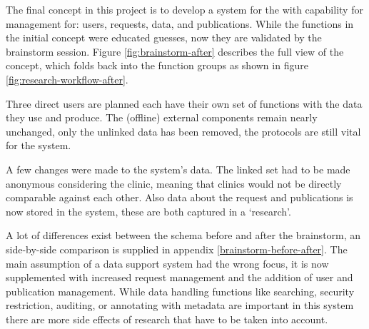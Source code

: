 The final concept in this project is to develop a system for the \projectdata{} with capability for management for: users, requests, data, and publications.
While the functions in the initial concept were educated guesses, now they are validated by the brainstorm session.
Figure \ref{fig:brainstorm-after} describes the full view of the concept, which folds back into the function groups as shown in figure \ref{fig:research-workflow-after}.

Three direct users are planned each have their own set of functions with the data they use and produce.
The (offline) external components remain nearly unchanged, only the unlinked data has been removed, the protocols are still vital for the system.

A few changes were made to the system's data.
The linked set had to be made anonymous considering the clinic, meaning that clinics would not be directly comparable against each other.
Also data about the request and publications is now stored in the system, these are both captured in a `research'.

A lot of differences exist between the schema before and after the brainstorm, an side-by-side comparison is supplied in appendix \ref{brainstorm-before-after}.
The main assumption of a data support system had the wrong focus, it is now supplemented with increased request management and the addition of user and publication management.
While data handling functions like searching, security restriction, auditing, or annotating with metadata are important in this system there are more side effects of research that have to be taken into account.